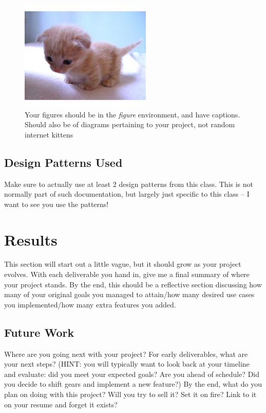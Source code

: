 \documentclass[10pt,conference,onecolumn,compsoc]{IEEEtran}
\begin{document}
\begin{figure}[ht!]
\includegraphics[scale=1.5]{cat2.jpg}
\caption{Your figures should be in the \emph{figure} environment, and have captions.  Should also be of diagrams pertaining to your project, not random internet kittens}
\label{cat2}
\end{figure}

\subsection{Design Patterns Used}
Make sure to actually use at least 2 design patterns from this class.  This is not normally part of such documentation, but largely just specific to this class -- I want to see you use the patterns!


\section{Results}
This section will start out a little vague, but it should grow as your project evolves.  With each deliverable you hand in, give me a final summary of where your project stands.  By the end, this should be a reflective section discussing how many of your original goals you managed to attain/how many desired use cases you implemented/how many extra features you added.

\subsection{Future Work}
Where are you going next with your project?
For early deliverables, what are your next steps?  (HINT: you will typically want to look back at your timeline and evaluate: did you meet your expected goals?  Are you ahead of schedule?  Did you decide to shift gears and implement a new feature?)
By the end, what do you plan on doing with this project?  Will you try to sell it?  Set it on fire?  Link to it on your resume and forget it exists?
\end{document}
